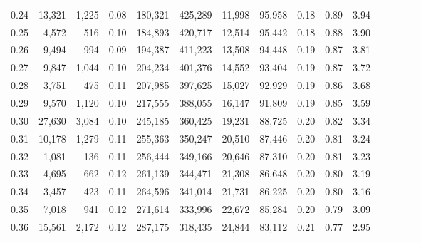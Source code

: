 \begin{tabular}{rrrcrrrrrrrrrrr}
0.24 &  13,321 &   1,225 &                                       0.08 &  180,321 &  425,289 &   11,998 &   95,958 &  0.18 &  0.89 &                         3.94 \\
0.25 &   4,572 &     516 &                                       0.10 &  184,893 &  420,717 &   12,514 &   95,442 &  0.18 &  0.88 &                         3.90 \\
0.26 &   9,494 &     994 &                                       0.09 &  194,387 &  411,223 &   13,508 &   94,448 &  0.19 &  0.87 &                         3.81 \\
0.27 &   9,847 &   1,044 &                                       0.10 &  204,234 &  401,376 &   14,552 &   93,404 &  0.19 &  0.87 &                         3.72 \\
0.28 &   3,751 &     475 &                                       0.11 &  207,985 &  397,625 &   15,027 &   92,929 &  0.19 &  0.86 &                         3.68 \\
0.29 &   9,570 &   1,120 &                                       0.10 &  217,555 &  388,055 &   16,147 &   91,809 &  0.19 &  0.85 &                         3.59 \\
0.30 &  27,630 &   3,084 &                                       0.10 &  245,185 &  360,425 &   19,231 &   88,725 &  0.20 &  0.82 &                         3.34 \\
0.31 &  10,178 &   1,279 &                                       0.11 &  255,363 &  350,247 &   20,510 &   87,446 &  0.20 &  0.81 &                         3.24 \\
0.32 &   1,081 &     136 &                                       0.11 &  256,444 &  349,166 &   20,646 &   87,310 &  0.20 &  0.81 &                         3.23 \\
0.33 &   4,695 &     662 &                                       0.12 &  261,139 &  344,471 &   21,308 &   86,648 &  0.20 &  0.80 &                         3.19 \\
0.34 &   3,457 &     423 &                                       0.11 &  264,596 &  341,014 &   21,731 &   86,225 &  0.20 &  0.80 &                         3.16 \\
0.35 &   7,018 &     941 &                                       0.12 &  271,614 &  333,996 &   22,672 &   85,284 &  0.20 &  0.79 &                         3.09 \\
0.36 &  15,561 &   2,172 &                                       0.12 &  287,175 &  318,435 &   24,844 &   83,112 &  0.21 &  0.77 &                         2.95 \\

\end{tabular}
